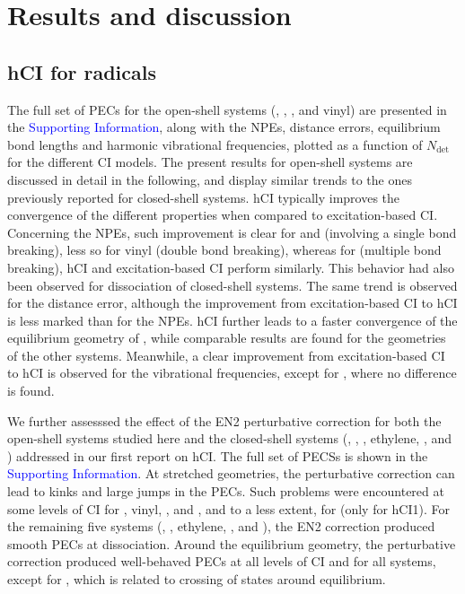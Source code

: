 \documentclass[aip,jcp,reprint,noshowkeys,superscriptaddress]{revtex4-1}
\newcommand{\SupInf}{\textcolor{blue}{Supporting Information}}
\newcommand{\Ndet}{N_\text{det}}
\begin{document}
\section{Results and discussion}
\label{sec:res}


\subsection{hCI for radicals}
\label{sec:res_A}


The full set of PECs for the open-shell systems (, , , and vinyl) are presented in the {\SupInf},
along with the NPEs, distance errors, equilibrium bond lengths and harmonic vibrational frequencies, plotted as a function of $\Ndet$ for the different CI models.
The present results for open-shell systems are discussed in detail in the following,
and display similar trends to the ones previously reported for closed-shell systems. \cite{Kossoski_2022}
hCI typically improves the convergence of the different properties when compared to excitation-based CI.
Concerning the NPEs, such improvement is clear for  and  (involving a single bond breaking), less so for vinyl (double bond breaking),
whereas for  (multiple bond breaking), hCI and excitation-based CI perform similarly.
This behavior had also been observed for dissociation of closed-shell systems. \cite{Kossoski_2022}
The same trend is observed for the distance error, although the improvement from excitation-based CI to hCI is less marked than for the NPEs.
hCI further leads to a faster convergence of the equilibrium geometry of , while comparable results are found for the geometries of the other systems.
Meanwhile, a clear improvement from excitation-based CI to hCI is observed for the vibrational frequencies, except for , where no difference is found.


We further assesssed the effect of the EN2 perturbative correction for both the open-shell systems studied here 
and the closed-shell systems (, , , ethylene, , and ) addressed in our first report on hCI. \cite{Kossoski_2022}
The full set of PECSs is shown in the {\SupInf}.
At stretched geometries, the perturbative correction can lead to kinks and large jumps in the PECs.
Such problems were encountered at some levels of CI for , vinyl, , and , and to a less extent, for  (only for hCI1).
For the remaining five systems (, , ethylene, , and ),
the EN2 correction produced smooth PECs at dissociation.
Around the equilibrium geometry, the perturbative correction produced well-behaved PECs at all levels of CI and for all systems, 
except for , which is related to crossing of states around equilibrium.
\end{document}

